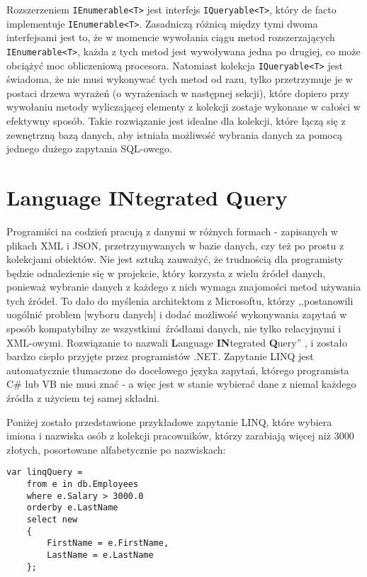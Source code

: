 Rozszerzeniem \texttt{IEnumerable<T>} jest interfejs \texttt{IQueryable<T>}, który de facto implementuje \texttt{IEnumerable<T>}. Zasadniczą różnicą między tymi dwoma interfejsami jest to, że w momencie wywołania ciągu metod rozszerzających \texttt{IEnumerable<T>}, każda z tych metod jest wywoływana jedna po drugiej, co może obciążyć moc obliczeniową procesora. Natomiast kolekcja \texttt{IQueryable<T>} jest świadoma, że nie musi wykonywać tych metod od razu, tylko przetrzymuje je w postaci drzewa wyrażeń (o wyrażeniach w następnej sekcji), które dopiero przy wywołaniu metody wyliczającej elementy z kolekcji zostaje wykonane w całości w efektywny sposób. Takie rozwiązanie jest idealne dla kolekcji, które łączą się z zewnętrzną bazą danych, aby istniała możliwość wybrania danych za pomocą jednego dużego zapytania SQL-owego.

\section{Language INtegrated Query}
Programiści na codzień pracują z danymi w różnych formach - zapisanych w plikach XML i JSON, przetrzymywanych w bazie danych, czy też po prostu z kolekcjami obiektów. Nie jest sztuką zauważyć, że trudnością dla programisty będzie odnalezienie się w projekcie, który korzysta z wielu źródeł danych, ponieważ wybranie danych z każdego z nich wymaga znajomości metod używania tych źródeł. To dało do myślenia architektom z Microsoftu, którzy ,,postanowili uogólnić problem [wyboru danych] i dodać możliwość wykonywania zapytań w sposób kompatybilny ze wszystkimi źródłami danych, nie tylko relacyjnymi i XML-owymi. Rozwiązanie to nazwali \textbf{L}anguage \textbf{IN}tegrated \textbf{Q}uery'' \cite{msdn_linq}, i zostało bardzo ciepło przyjęte przez programistów .NET. Zapytanie LINQ jest automatycznie tłumaczone do docelowego języka zapytań, którego programista C\# lub VB nie musi znać - a więc jest w stanie wybierać dane z niemal każdego źródła z użyciem tej samej składni.

Poniżej zostało przedstawione przykładowe zapytanie LINQ, które wybiera imiona i nazwiska osób z kolekcji pracowników, którzy zarabiają więcej niż 3000 złotych, posortowane alfabetycznie po nazwiskach:

\begin{lstlisting}
var linqQuery = 
    from e in db.Employees
    where e.Salary > 3000.0
    orderby e.LastName
    select new
    { 
        FirstName = e.FirstName,
        LastName = e.LastName
    };
\end{lstlisting}

